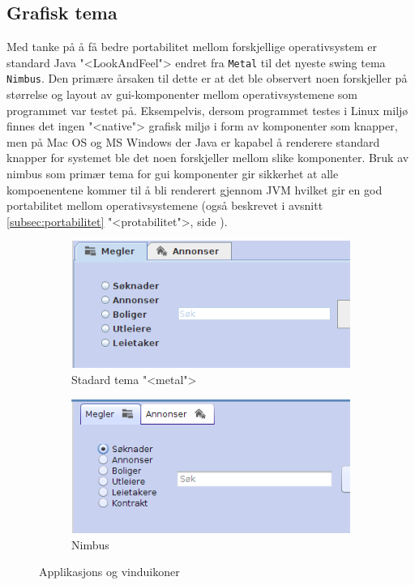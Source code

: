 \subsection{Grafisk tema}
Med tanke på å få bedre portabilitet mellom forskjellige operativsystem er standard Java "<LookAndFeel"> endret fra \texttt{Metal} til det nyeste swing tema \texttt{Nimbus}. Den primære årsaken til dette er at det ble observert noen forskjeller på størrelse og layout av gui-komponenter mellom operativsystemene som programmet var testet på. Eksempelvis, dersom programmet testes i Linux miljø finnes det ingen "<native"> grafisk miljø i form av komponenter som knapper, men på Mac OS og MS Windows der Java er kapabel å renderere standard knapper for systemet ble det noen forskjeller mellom slike komponenter. Bruk av nimbus som primær tema for gui komponenter gir sikkerhet at alle kompoenentene kommer til å bli renderert gjennom JVM hvilket gir en god portabilitet mellom operativsystemene (også beskrevet i avsnitt \ref{subsec:portabilitet} "<protabilitet">, side \pageref{subsec:portabilitet}).

\begin{figure}[ht!]
\centering
\begin{subfigure}[b]{0.3\textwidth}
\centering
\includegraphics[trim=0cm 0cm 7cm 0cm, clip,scale=0.5]{./img/produktdokumentasjon/visuelle_detaljer/metal.png}
\caption{Stadard tema "<metal">}
\end{subfigure}
\begin{subfigure}[b]{0.3\textwidth}
\centering
\includegraphics[trim=0cm 0cm 7cm 0.2cm, clip,scale=0.5]{./img/produktdokumentasjon/visuelle_detaljer/nimbus.png}
\caption{Nimbus}
\end{subfigure}
\caption{Applikasjons og vinduikoner}\label{fig:tema}
\end{figure}